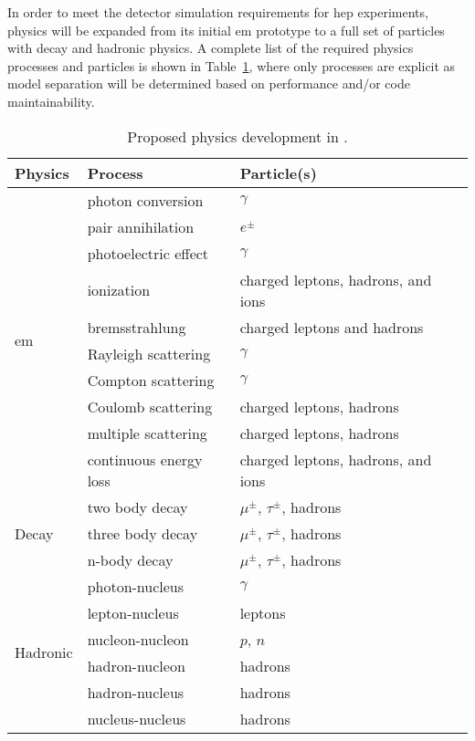 In order to meet the detector simulation requirements for \acs{hep} experiments,
\celeritas physics will be expanded from its initial \ac{em} prototype to a full
set of particles with decay and hadronic physics.  A complete list of the
required physics processes and particles is shown in
Table~\ref{tab:proposed-physics}, where only processes are explicit as model
separation will be determined based on performance and/or code maintainability.
\begin{table}
  \caption{Proposed physics development in \celeritas.}
  \label{tab:proposed-physics}
  \centering
  \begin{tabular}{llll}
    \toprule
    Physics & Process & Particle(s)\\
    \midrule
    \multirow{10}{*}{\acs{em}} & photon conversion & $\gamma$\\
    & pair annihilation & $e^\pm$\\
    & photoelectric effect& $\gamma$\\
    & ionization & charged leptons, hadrons, and ions\\
    & bremsstrahlung & charged leptons and hadrons\\
    & Rayleigh scattering & $\gamma$\\
    & Compton scattering & $\gamma$\\
    & Coulomb scattering & charged leptons, hadrons\\
    & multiple scattering & charged leptons, hadrons\\
    & continuous energy loss & charged leptons, hadrons, and ions\\
    \midrule
    \multirow{3}{*}{Decay}
    & two body decay & $\mu^\pm$, $\tau^\pm$, hadrons\\
    & three body decay & $\mu^\pm$, $\tau^\pm$, hadrons\\
    & n-body decay & $\mu^\pm$, $\tau^\pm$, hadrons\\
    \midrule
    \multirow{6}{*}{Hadronic}
    & photon-nucleus & $\gamma$ \\
    & lepton-nucleus & leptons \\
    & nucleon-nucleon & $p$, $n$\\
    & hadron-nucleon & hadrons\\
    & hadron-nucleus & hadrons\\
    & nucleus-nucleus & hadrons\\
    \bottomrule
  \end{tabular}
\end{table}

